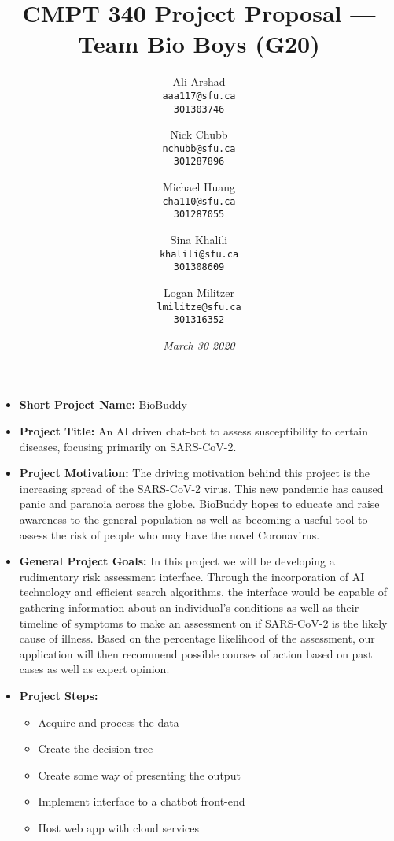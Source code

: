 \documentclass{article}
\title{CMPT 340 Project Proposal --- Team Bio Boys (G20)}
\author {
      Ali Arshad\\
      \texttt{aaa117@sfu.ca}\\
      \texttt{301303746}
      \and
      Nick Chubb\\
      \texttt{nchubb@sfu.ca}\\
      \texttt{301287896}
      \and
      Michael Huang\\
      \texttt{cha110@sfu.ca}\\
      \texttt{301287055}
      \and
      Sina Khalili\\
      \texttt{khalili@sfu.ca}\\
      \texttt{301308609}
      \and
      Logan Militzer\\
      \texttt{lmilitze@sfu.ca}\\
      \texttt{301316352}
    }
\date{\emph{\vfill{March 30 2020}}}
\begin{document}
\maketitle
\thispagestyle{empty}

\newpage

\begin{itemize}
    \item \textbf{Short Project Name:} BioBuddy
    
    \item \textbf{Project Title:} An AI driven chat-bot to assess susceptibility to certain diseases, focusing primarily on SARS-CoV-2. 
    
    \item \textbf{Project Motivation:} The driving motivation behind this project is the increasing spread of the SARS-CoV-2 virus. This new pandemic has caused panic and paranoia across the globe. BioBuddy hopes to educate and raise awareness to the general population as well as becoming a useful tool to assess the risk of people who may have the novel Coronavirus.
    
    \item \textbf{General Project Goals:} In this project we will be developing a rudimentary risk assessment interface. Through the incorporation of AI technology and efficient search algorithms, the interface would be capable of gathering information about an individual’s conditions as well as their timeline of symptoms to make an assessment on if SARS-CoV-2 is the likely cause of illness. Based on the percentage likelihood of the assessment, our application will then recommend possible courses of action based on past cases as well as expert opinion.  
    
    \item \textbf{Project Steps:}
    \begin{itemize}
    \item Acquire and process the data
    \item Create the decision tree 
    \item Create some way of presenting the output 
    \item Implement interface to a chatbot front-end 
    \item Host web app with cloud services
    \end{itemize}
    

\end{itemize}
\end{document}
